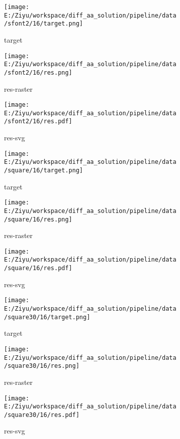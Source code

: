 \documentclass{article}%
\begin{document}
%


\begin{figure}[H]%
\begin{subfigure}[b]{0.32\linewidth}%
\texttt{[image: E:/Ziyu/workspace/diff\_aa\_solution/pipeline/data/sfont2/16/target.png]}%
\caption{target}%
\end{subfigure}%
\begin{subfigure}[b]{0.32\linewidth}%
\texttt{[image: E:/Ziyu/workspace/diff\_aa\_solution/pipeline/data/sfont2/16/res.png]}%
\caption{res{-}raster}%
\end{subfigure}%
\begin{subfigure}[b]{0.32\linewidth}%
\texttt{[image: E:/Ziyu/workspace/diff\_aa\_solution/pipeline/data/sfont2/16/res.pdf]}%
\caption{res{-}svg}%
\end{subfigure}%
\par\vspace{1em}%
\caption{}%
\clearpage%
\end{figure}

%


\begin{figure}[H]%
\begin{subfigure}[b]{0.32\linewidth}%
\texttt{[image: E:/Ziyu/workspace/diff\_aa\_solution/pipeline/data/square/16/target.png]}%
\caption{target}%
\end{subfigure}%
\begin{subfigure}[b]{0.32\linewidth}%
\texttt{[image: E:/Ziyu/workspace/diff\_aa\_solution/pipeline/data/square/16/res.png]}%
\caption{res{-}raster}%
\end{subfigure}%
\begin{subfigure}[b]{0.32\linewidth}%
\texttt{[image: E:/Ziyu/workspace/diff\_aa\_solution/pipeline/data/square/16/res.pdf]}%
\caption{res{-}svg}%
\end{subfigure}%
\par\vspace{1em}%
\caption{}%
\end{figure}

%


\begin{figure}[H]%
\begin{subfigure}[b]{0.32\linewidth}%
\texttt{[image: E:/Ziyu/workspace/diff\_aa\_solution/pipeline/data/square30/16/target.png]}%
\caption{target}%
\end{subfigure}%
\begin{subfigure}[b]{0.32\linewidth}%
\texttt{[image: E:/Ziyu/workspace/diff\_aa\_solution/pipeline/data/square30/16/res.png]}%
\caption{res{-}raster}%
\end{subfigure}%
\begin{subfigure}[b]{0.32\linewidth}%
\texttt{[image: E:/Ziyu/workspace/diff\_aa\_solution/pipeline/data/square30/16/res.pdf]}%
\caption{res{-}svg}%
\end{subfigure}%
\par\vspace{1em}%
\caption{}%
\end{figure}
\end{document}
